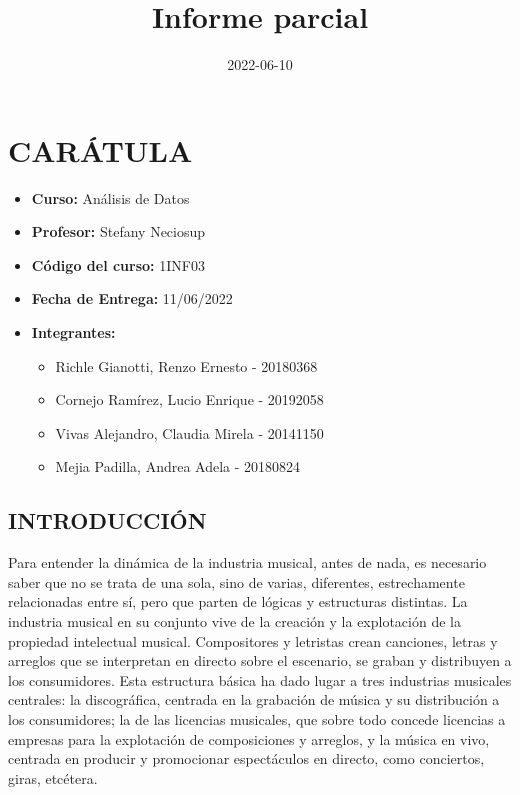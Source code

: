 \documentclass[
  letterpaper,
  DIV=11,
  numbers=noendperiod]{scrartcl}
\title{Informe parcial}
\author{}
\date{2022-06-10}
\providecommand{\tightlist}{%
  \setlength{\itemsep}{0pt}\setlength{\parskip}{0pt}}
\renewcommand*\contentsname{Table of contents}
\begin{document}
\maketitle

\renewcommand*\contentsname{Table of contents}
{
\hypersetup{linkcolor=}
\setcounter{tocdepth}{4}
\tableofcontents
}
\hypertarget{caruxe1tula}{%
\section{CARÁTULA}\label{caruxe1tula}}

\begin{itemize}
\item
  \textbf{Curso:} Análisis de Datos
\item
  \textbf{Profesor:} Stefany Neciosup
\item
  \textbf{Código del curso:} 1INF03
\item
  \textbf{Fecha de Entrega:} 11/06/2022
\item
  \textbf{Integrantes:}

  \begin{itemize}
  \tightlist
  \item
    Richle Gianotti, Renzo Ernesto - 20180368
  \item
    Cornejo Ramírez, Lucio Enrique - 20192058
  \item
    Vivas Alejandro, Claudia Mirela - 20141150
  \item
    Mejia Padilla, Andrea Adela - 20180824
  \end{itemize}
\end{itemize}

\hypertarget{introducciuxf3n}{%
\subsection{INTRODUCCIÓN}\label{introducciuxf3n}}

Para entender la dinámica de la industria musical, antes de nada, es
necesario saber que no se trata de una sola, sino de varias, diferentes,
estrechamente relacionadas entre sí, pero que parten de lógicas y
estructuras distintas. La industria musical en su conjunto vive de la
creación y la explotación de la propiedad intelectual musical.
Compositores y letristas crean canciones, letras y arreglos que se
interpretan en directo sobre el escenario, se graban y distribuyen a los
consumidores. Esta estructura básica ha dado lugar a tres industrias
musicales centrales: la discográfica, centrada en la grabación de música
y su distribución a los consumidores; la de las licencias musicales, que
sobre todo concede licencias a empresas para la explotación de
composiciones y arreglos, y la música en vivo, centrada en producir y
promocionar espectáculos en directo, como conciertos, giras, etcétera.
\end{document}

